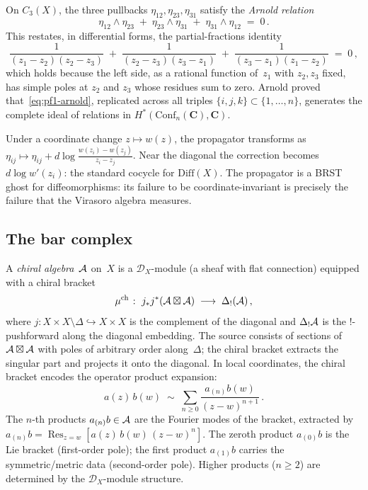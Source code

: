 On $C_3(X)$, the three pullbacks
$\eta_{12}, \eta_{23}, \eta_{31}$ satisfy the \emph{Arnold relation}
\begin{equation}\label{eq:pf1-arnold}
\eta_{12} \wedge \eta_{23}
\;+\; \eta_{23} \wedge \eta_{31}
\;+\; \eta_{31} \wedge \eta_{12}
\;=\; 0\,.
\end{equation}
This restates, in differential forms, the partial-fractions identity
\[
\frac{1}{(z_1 - z_2)(z_2 - z_3)}
\;+\; \frac{1}{(z_2 - z_3)(z_3 - z_1)}
\;+\; \frac{1}{(z_3 - z_1)(z_1 - z_2)}
\;=\; 0\,,
\]
which holds because the left side, as a rational function of~$z_1$
with $z_2, z_3$ fixed, has simple poles at $z_2$ and $z_3$ whose
residues sum to zero. Arnold proved that~\eqref{eq:pf1-arnold},
replicated across all triples
$\{i,j,k\} \subset \{1, \ldots, n\}$, generates the complete ideal
of relations in $H^*(\mathrm{Conf}_n(\mathbf{C}), \mathbf{C})$.

Under a coordinate change $z \mapsto w(z)$, the propagator
transforms as
$\eta_{ij} \mapsto \eta_{ij}
+ d\log\frac{w(z_i) - w(z_j)}{z_i - z_j}$.
Near the diagonal the correction becomes
$d\log w'(z_i)$: the standard cocycle for
$\mathrm{Diff}(X)$.
The propagator is a BRST ghost for diffeomorphisms: its failure to
be coordinate-invariant is precisely the failure that the Virasoro
algebra measures.


\subsection*{The bar complex}

A \emph{chiral algebra}~$\mathcal{A}$ on~$X$ is a $\mathcal D_X$-module
(a sheaf with flat connection) equipped with a chiral bracket
\[
\mu^{\mathrm{ch}}
\;\colon\;
j_*j^*(\mathcal{A}\boxtimes\mathcal{A})
\;\longrightarrow\;
\Delta_!(\mathcal{A})\,,
\]
where $j\colon X\times X\setminus\Delta
\hookrightarrow X\times X$ is the complement of the diagonal
and $\Delta_!\mathcal{A}$ is the $!$-pushforward along the diagonal
embedding. The source consists of sections of
$\mathcal{A} \boxtimes \mathcal{A}$ with poles of arbitrary order
along~$\Delta$; the chiral bracket extracts the singular part
and projects it onto the diagonal. In local coordinates, the
chiral bracket encodes the operator product expansion:
\[
a(z)\,b(w)
\;\sim\;
\sum_{n\ge 0}\frac{a_{(n)}b(w)}{(z-w)^{n+1}}\,.
\]
The $n$-th products $a_{(n)}b\in\mathcal{A}$ are the Fourier modes of
the bracket, extracted by
$a_{(n)}b = \operatorname{Res}_{z=w}
[a(z)\,b(w)\,(z{-}w)^n]$.
The zeroth product $a_{(0)}b$ is the Lie bracket
(first-order pole); the first product $a_{(1)}b$ carries the
symmetric/metric data (second-order pole). Higher products
($n\ge 2$) are determined by the $\mathcal D_X$-module
structure.

